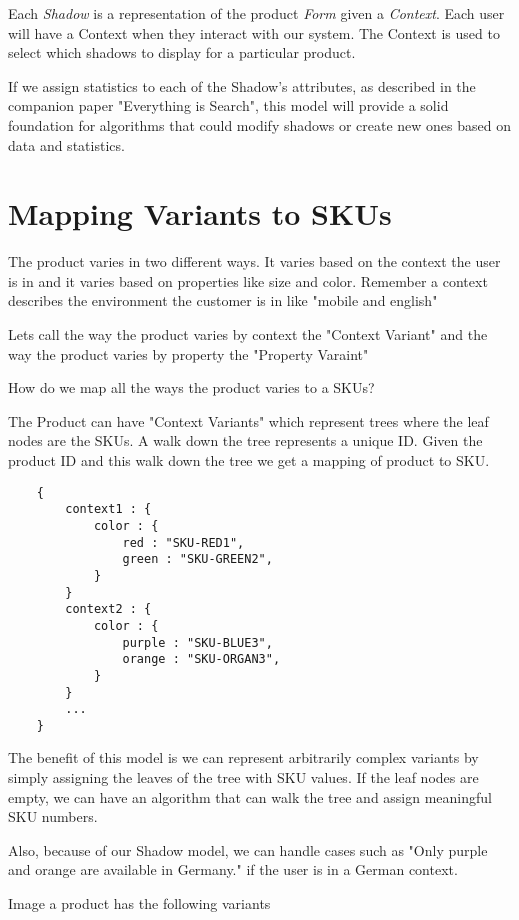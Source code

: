 \documentclass[11pt]{article}
\begin{document}
Each \emph{Shadow} is a representation of the product \emph{Form} given a \emph{Context}. Each user
will have a Context when they interact with our system. The Context is used
to select which shadows to display for a particular product.

If we assign statistics to each of the Shadow's attributes, as described in 
the companion paper "Everything is Search", this model will provide a solid
foundation for algorithms that could modify shadows or create new ones based on 
data and statistics.

\newpage
\section{Mapping Variants to SKUs}

The product varies in two different ways. It varies based on the context the user
is in and it varies based on properties like size and color. Remember a context
describes the environment the customer is in like "mobile and english"

Lets call the way the product varies by context the "Context Variant" and the way
the product varies by property the "Property Varaint"

How do we map all the ways the product varies to a SKUs? 

The Product can have "Context Variants" which represent trees where the leaf nodes are
the SKUs. A walk down the tree represents a unique ID. Given the product ID and this
walk down the tree we get a mapping of product to SKU.

\begin{lstlisting}
    {
        context1 : {
            color : {
                red : "SKU-RED1",
                green : "SKU-GREEN2",
            }
        }
        context2 : {
            color : {
                purple : "SKU-BLUE3",
                orange : "SKU-ORGAN3",
            }
        }
        ...
    }
\end{lstlisting}

The benefit of this model is we can represent arbitrarily complex variants 
by simply assigning the leaves of the tree with SKU values. If the leaf nodes are
empty, we can have an algorithm that can walk the tree and assign meaningful
SKU numbers.

Also, because of our Shadow model, we can handle cases such as "Only purple and orange
are available in Germany." if the user is in a German context. 

Image a product has the following variants
\end{document}
